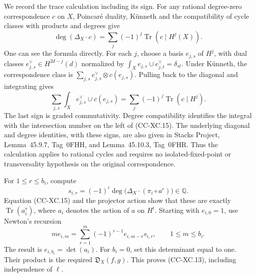 We record the trace calculation including its sign.
For any rational degree-zero correspondence \(c\) on \(X\),
Poincaré duality, Künneth and the compatibility of cycle
classes with products and degrees give
\[
 \deg(\Delta_X\cdot c)
                  =\sum_j(-1)^j\operatorname{Tr}(c\mid H^j(X)).
                                                        \tag{CC-XC.15}
\]
One can see the formula directly.  For each \(j\), choose
a basis \(e_{j,s}\) of \(H^j\), with dual classes
\(e^\vee_{j,s}\in H^{2d-j}(d)\) normalized by
\(\int_X e_{j,s}\cup e^\vee_{j,t}=\delta_{st}\).
Under Künneth, the correspondence class is
\(\sum_{j,s}e^\vee_{j,s}\otimes c(e_{j,s})\).
Pulling back to the diagonal and integrating gives
\[
 \sum_{j,s}\int_X e^\vee_{j,s}\cup c(e_{j,s})
                    =\sum_j(-1)^j\operatorname{Tr}(c\mid H^j).
 \]
The last sign is graded commutativity.  Degree compatibility
identifies the integral with the intersection number on the
left of (CC-XC.15).  The underlying diagonal and degree
identities, with these signs, are also given in Stacks
Project, Lemma~45.9.7, Tag~0FHH, and Lemma~45.10.3,
Tag~0FHR.  Thus the calculation applies to rational cycles
and requires no isolated-fixed-point or transversality
hypothesis on the original correspondence.

For \(1\le r\le b_i\), compute
\[
 s_{i,r}=(-1)^i\deg\bigl(\Delta_X\cdot(\pi_i\circ a^r)\bigr)
                         \in\mathbb Q.                  \tag{CC-XC.16}
\]
Equation (CC-XC.15) and the projector action show that these
are exactly \(\operatorname{Tr}(a_i^r)\), where \(a_i\)
denotes the action of \(a\) on \(H^i\).
Starting with \(e_{i,0}=1\), use Newton's recursion
\[
 m e_{i,m}=
      \sum_{r=1}^{m}(-1)^{r-1}e_{i,m-r}s_{i,r},
                 \qquad 1\le m\le b_i.                 \tag{CC-XC.17}
\]
The result is \(e_{i,b_i}=\det(a_i)\).
For \(b_i=0\), set this determinant equal to one.
Their product is the required \(\mathfrak D_X(f,g)\).
This proves (CC-XC.13), including independence of \(\ell\).

